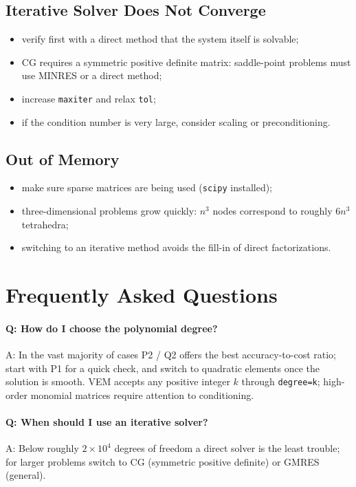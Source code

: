 \documentclass[11pt,oneside]{book}
\theoremstyle{definition}
\theoremstyle{plain}
\newcommand{\code}[1]{\texttt{#1}}
\begin{document}
\subsection{Iterative Solver Does Not Converge}

\begin{itemize}[itemsep=0.2em]
  \item verify first with a direct method that the system itself is solvable;
  \item CG requires a symmetric positive definite matrix: saddle-point problems must
        use MINRES or a direct method;
  \item increase \code{maxiter} and relax \code{tol};
  \item if the condition number is very large, consider scaling or preconditioning.
\end{itemize}

\subsection{Out of Memory}

\begin{itemize}[itemsep=0.2em]
  \item make sure sparse matrices are being used (\code{scipy} installed);
  \item three-dimensional problems grow quickly: $n^3$ nodes correspond to roughly
        $6n^3$ tetrahedra;
  \item switching to an iterative method avoids the fill-in of direct
        factorizations.
\end{itemize}

\section{Frequently Asked Questions}

\paragraph{Q: How do I choose the polynomial degree?}
A: In the vast majority of cases P2 / Q2 offers the best accuracy-to-cost ratio; start
with P1 for a quick check, and switch to quadratic elements once the solution is
smooth. VEM accepts any positive integer $k$ through \code{degree=k}; high-order
monomial matrices require attention to conditioning.

\paragraph{Q: When should I use an iterative solver?}
A: Below roughly $2\times10^4$ degrees of freedom a direct solver is the least
trouble; for larger problems switch to CG (symmetric positive definite) or GMRES
(general).
\end{document}
